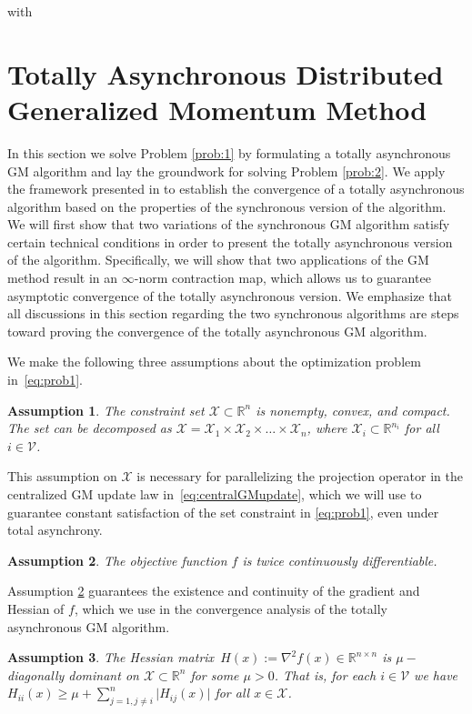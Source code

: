 \documentclass[9pt,shortpaper,twoside,web]{ieeecolor}
\newcommand{\R}{\ensuremath{\mathbb{R}}\xspace}
\newcommand{\X}{\ensuremath{\mathcal{X}}\xspace}
\newcommand{\V}{\ensuremath{\mathcal{V}}\xspace}
\newtheorem{assumption}{Assumption}
\begin{document}
with \section{Totally Asynchronous Distributed Generalized Momentum Method}




In this section we solve Problem \ref{prob:1} by formulating a totally asynchronous GM algorithm and lay the groundwork for solving Problem \ref{prob:2}.
We apply the framework presented in \cite{bertsekas1989parallel} to establish the convergence of a totally asynchronous algorithm based on the properties of the synchronous version of the algorithm.
We will first show that two variations of the synchronous GM algorithm satisfy certain technical conditions in order to present the totally asynchronous version of the algorithm.
Specifically, we will show that two applications of the GM method result in an $\infty$-norm contraction map, which allows us to guarantee asymptotic convergence of the totally asynchronous version.
We emphasize that all discussions in this section regarding the two synchronous algorithms
are steps toward proving the convergence of the totally asynchronous GM algorithm.

We make the following three assumptions about the optimization problem in~\eqref{eq:prob1}.

\begin{assumption}\label{ass:X}
    The constraint set $\X\subset \R^n$ is nonempty, convex, and compact. The set can be decomposed as $\X=\X_1 \times \X_2 \times \dots \times \X_n$, where $\X_i\subset \R^{n_i}$ for all $i\in \V$.
\end{assumption}

This assumption on $\X$ is necessary for parallelizing the projection operator in the centralized GM update law in~\eqref{eq:centralGMupdate}, which
we will use to 
guarantee constant satisfaction of the set constraint in \eqref{eq:prob1}, even under total asynchrony.


\begin{assumption}\label{ass:f}
    The objective function $f$ is twice continuously differentiable.
\end{assumption}

Assumption \ref{ass:f} guarantees the existence and continuity of the gradient and Hessian of $f$, which we 
use in the convergence analysis of the totally asynchronous GM algorithm.


\begin{assumption} \label{ass:H}
    The Hessian matrix~$H(x):=\nabla^2f(x)\in \R^{n\times n}$ is $\mu-$diagonally dominant on $\X\subset \R^n$ for some $\mu>0$. 
    That is, for each $i\in \V$ we have $H_{ii}(x)\geq \mu + \sum_{j=1,j\not=i}^n\vert H_{ij}(x) \vert$ for all $x\in \X$.
\end{assumption}
\end{document}
